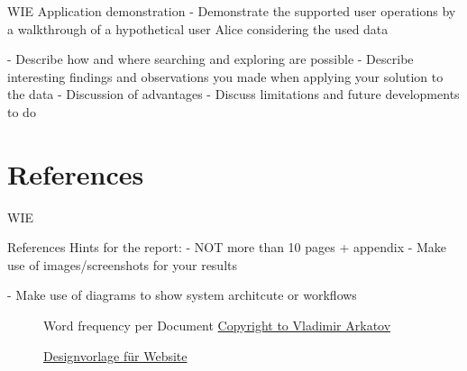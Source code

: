 \documentclass[runningheads]{llncs}
\begin{document}
WIE
Application demonstration
- Demonstrate the supported user operations by a walkthrough of a hypothetical
user Alice considering the used data

- Describe how and where searching and exploring are possible
- Describe interesting findings and observations you made when applying your solution to the data
- Discussion of advantages
- Discuss limitations and future developments to do
           



\section{References}
WIE

References Hints for the report:
- NOT more than 10 pages + appendix
- Make use of images/screenshots for your results

- Make use of diagrams to show system architcute or workflows


\begin{figure}
    \centering
    \caption{Word frequency per Document \href{https://www.123rf.com/photo_36990141_stock-vector-infographics-with-sound-waves-on-world.html}{Copyright to Vladimir Arkatov}}
    \label{fig:circle-digram}
\end{figure}


\begin{figure}
    \centering
    \caption{\href{https://rawgraphs.io}{Designvorlage für Website}}
    \label{fig:website-reference}
\end{figure}
\end{document}
